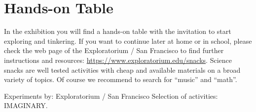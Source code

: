 \section{Hands-on Table}
In the exhibition you will find a hands-on table with the invitation to start exploring and tinkering. If you want to continue later at home or in school, please check the web page of the Exploratorium / San Francisco to find further instructions and resources: \url{https://www.exploratorium.edu/snacks}. Science snacks are well tested activities with cheap and available materials on a broad variety of topics. Of course we recommend to search for ``music'' and ``math''.

\vfill

Experiments by: Exploratorium / San Francisco
Selection of activities: IMAGINARY.
